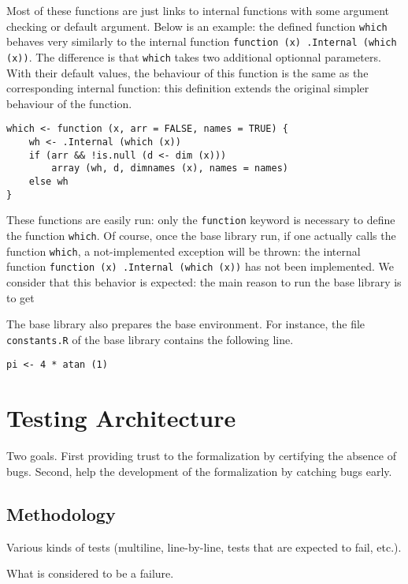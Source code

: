 \documentclass[
    sigplan,
    10pt,
    review, %
    natbib=false %
 ]{acmart}
\begin{document}
Most of these functions are just links to internal functions
with some argument checking or default argument.
Below is an example:
the defined function \texttt{which} behaves very similarly
to the internal function \texttt{function (x) .Internal (which (x))}.
The difference is that \texttt{which} takes two additional
optionnal parameters.
With their default values, the behaviour of this function
is the same as the corresponding internal function:
this definition extends the original simpler behaviour of the function.
\begin{verbatim}
which <- function (x, arr = FALSE, names = TRUE) {
    wh <- .Internal (which (x))
    if (arr && !is.null (d <- dim (x)))
        array (wh, d, dimnames (x), names = names)
    else wh
}
\end{verbatim}

These functions are easily run:
only the \texttt{function} keyword is necessary
to define the function \texttt{which}.
Of course, once the base library run,
if one actually calls the function \texttt{which},
a not-implemented exception will be thrown:
the internal function \texttt{function (x) .Internal (which (x))}
has not been implemented.
%
We consider that this behavior is expected:
the main reason to run the base library is to get

The base library also prepares the base environment.
For instance, the file \texttt{constants.R} of the base library
contains the following line.
\begin{verbatim}
pi <- 4 * atan (1)
\end{verbatim}

\section{Testing Architecture}
\label{sec:testing:architecture}

Two goals.
First providing trust to the formalization by certifying the absence of bugs.
Second, help the development of the formalization by catching bugs early.

\subsection{Methodology}
\label{sec:test:methodology}

Various kinds of tests (multiline, line-by-line, tests that are expected to fail, etc.).

What is considered to be a failure.
\end{document}
